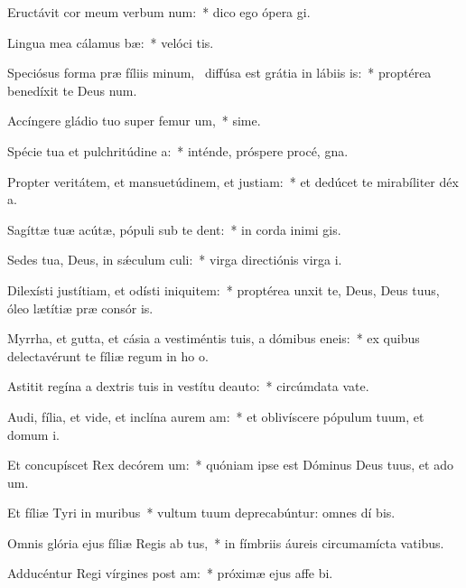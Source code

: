 \item Eructávit cor meum verbum num:~* dico ego ópera  gi.
\item Lingua mea cálamus bæ:~* velóci tis.
\item Speciósus forma præ fíliis minum,~\pscross{} diffúsa est grátia in lábiis is:~* proptérea benedíxit te Deus  num.
\item Accíngere gládio tuo super femur um,~* sime.
\item Spécie tua et pulchritúdine a:~* inténde, próspere procé,  gna.
\item Propter veritátem, et mansuetúdinem, et justiam:~* et dedúcet te mirabíliter déx a.
\item Sagíttæ tuæ acútæ, pópuli sub te dent:~* in corda inimi gis.
\item Sedes tua, Deus, in sǽculum culi:~* virga directiónis virga  i.
\item Dilexísti justítiam, et odísti iniquitem:~* proptérea unxit te, Deus, Deus tuus, óleo lætítiæ præ consór is.
\item Myrrha, et gutta, et cásia a vestiméntis tuis, a dómibus eneis:~* ex quibus delectavérunt te fíliæ regum in ho o.
\item Astitit regína a dextris tuis in vestítu deauto:~* circúmdata vate.
\item Audi, fília, et vide, et inclína aurem am:~* et oblivíscere pópulum tuum, et domum  i.
\item Et concupíscet Rex decórem um:~* quóniam ipse est Dóminus Deus tuus, et ado um.
\item Et fíliæ Tyri in muribus~* vultum tuum deprecabúntur: omnes dí bis.
\item Omnis glória ejus fíliæ Regis ab tus,~* in fímbriis áureis circumamícta vatibus.
\item Adducéntur Regi vírgines post am:~* próximæ ejus affe bi.
